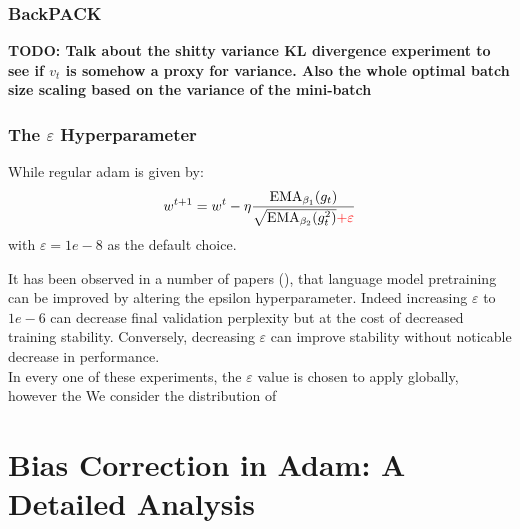 \documentclass[12pt]{book}
\newcommand{\todo}[1]{{\color{red}\bf{TODO: #1}}}
\begin{document}
\subsection{BackPACK}
\todo{Talk about the shitty variance KL divergence experiment to see if $v_t$ is somehow a proxy for variance. Also the whole optimal batch size scaling based on the variance of the mini-batch}
\subsection{The $\varepsilon $ Hyperparameter}
While regular adam is given by:
\[
	w^{t+1} = w^{t} - \eta \frac{\text{EMA}_{\beta_1}(g_t)}{\sqrt{\text{EMA}_{\beta_2}(g_t ^2) } \color{red}{+ \varepsilon  }}
\] 
with $\varepsilon = 1e-8$ as the default choice. 

It has been observed in a number of papers (\cite{yuan2020eadamoptimizerepsilonimpact}), that language model pretraining can be improved by altering the epsilon hyperparameter. Indeed increasing $\varepsilon $ to $1e-6$ can decrease final validation perplexity but at the cost of decreased training stability. Conversely, decreasing  $\varepsilon $ can improve stability without noticable decrease in performance. \\
In every one of these experiments, the $\varepsilon $ value is chosen to apply globally, however the 
We consider the distribution of 
\chapter{Bias Correction in Adam: A Detailed Analysis}
\label{chap: bias correction}
\end{document}
